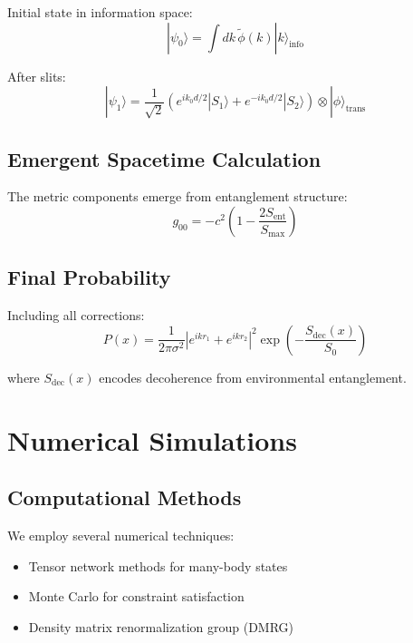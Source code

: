 \documentclass[12pt,a4paper]{article}
\begin{document}
Initial state in information space:
\begin{equation}
|\psi_0\rangle = \int dk \, \tilde{\phi}(k) |k\rangle_{\text{info}}
\end{equation}

After slits:
\begin{equation}
|\psi_1\rangle = \frac{1}{\sqrt{2}}\left(e^{ik_0 d/2}|S_1\rangle + e^{-ik_0 d/2}|S_2\rangle\right) \otimes |\phi\rangle_{\text{trans}}
\end{equation}

\subsection{Emergent Spacetime Calculation}

The metric components emerge from entanglement structure:
\begin{equation}
g_{00} = -c^2\left(1 - \frac{2S_{\text{ent}}}{S_{\text{max}}}\right)
\end{equation}

\subsection{Final Probability}

Including all corrections:
\begin{equation}
P(x) = \frac{1}{2\pi\sigma^2}\left|e^{ikr_1} + e^{ikr_2}\right|^2 \exp\left(-\frac{S_{\text{dec}}(x)}{S_0}\right)
\end{equation}

where $S_{\text{dec}}(x)$ encodes decoherence from environmental entanglement.

\section{Numerical Simulations}

\subsection{Computational Methods}

We employ several numerical techniques:
\begin{itemize}
\item Tensor network methods for many-body states
\item Monte Carlo for constraint satisfaction  
\item Density matrix renormalization group (DMRG)
\end{itemize}
\end{document}
